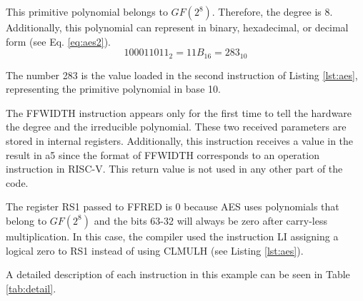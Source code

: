 This primitive polynomial belongs to $GF(2^8)$. Therefore, the degree is 8. Additionally, this polynomial can represent in binary, 
hexadecimal, or decimal form (see Eq. \ref{eq:aes2}). 
\begin{equation}
    100011011_{2}=11B_{16}=283_{10}
    \label{eq:aes2}
\end{equation}


The number 283 is the value loaded in the second instruction of Listing \ref{lst:aes}, representing the primitive polynomial in base 10.

The FFWIDTH instruction appears only for the first time to tell the hardware 
the degree and the irreducible polynomial. These two received parameters are stored in internal registers. 
Additionally, this instruction receives a value in the result in a5 since the format of FFWIDTH corresponds to an 
operation instruction in RISC-V. This return value is not used in any other part of the code.


The register RS1 passed to FFRED is 0 because AES uses polynomials that belong to $GF(2^8)$ 
and the bits 63-32 will always be zero after carry-less multiplication. In this case, the compiler used the instruction 
LI assigning a logical zero to RS1 instead of using CLMULH (see Listing \ref{lst:aes}). 

A detailed description of each instruction in this example can be seen in Table \ref{tab:detail}.



